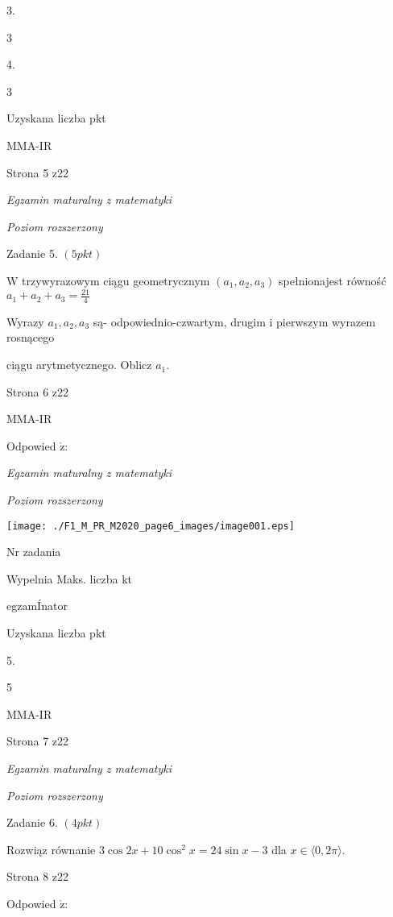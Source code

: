 \documentclass[a4paper,12pt]{article}
\begin{document}
3.

3

4.

3

Uzyskana liczba pkt

MMA-IR

Strona 5 z22





{\it Egzamin maturalny z matematyki}

{\it Poziom rozszerzony}

Zadanie 5. $(5pkt)$

$\mathrm{W}$ trzywyrazowym ciągu geometrycznym $(a_{1},a_{2},a_{3})$ spełnionajest równość $a_{1}+a_{2}+a_{3}=\displaystyle \frac{21}{4}$

Wyrazy $a_{1}, a_{2}, a_{3}$ są- odpowiednio-czwartym, drugim i pierwszym wyrazem rosnącego

ciągu arytmetycznego. Oblicz $a_{1}.$

Strona 6 z22

MMA-IR





Odpowied $\acute{\mathrm{z}}$:

{\it Egzamin maturalny z matematyki}

{\it Poziom rozszerzony}
\begin{center}
\texttt{[image: ./F1\_M\_PR\_M2020\_page6\_images/image001.eps]}
\end{center}
Nr zadania

Wypelnia Maks. liczba kt

egzamÍnator

Uzyskana liczba pkt

5.

5

MMA-IR

Strona 7 z22





{\it Egzamin maturalny z matematyki}

{\it Poziom rozszerzony}

Zadanie 6. $(4pkt)$

Rozwiąz równanie $3\cos 2x+10\cos^{2}x=24\sin x-3$ dla $x\in\langle 0, 2\pi\rangle.$

Strona 8 z22





Odpowied $\acute{\mathrm{z}}$:
\end{document}
